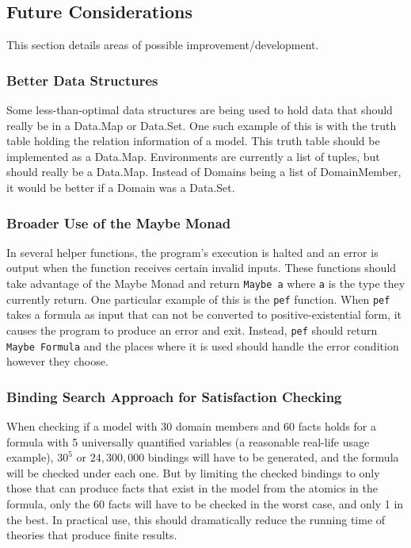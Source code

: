 	\subsection{Future Considerations}

		This section details areas of possible improvement/development.

		\subsubsection{Better Data Structures}

			Some less-than-optimal data structures are being used to hold data
			that should really be in a Data.Map or Data.Set. One such example
			of this is with the truth table holding the relation information of
			a model. This truth table should be implemented as a Data.Map.
			Environments are currently a list of tuples, but should really be a
			Data.Map. Instead of Domains being a list of DomainMember, it
			would be better if a Domain was a Data.Set.

		\subsubsection{Broader Use of the Maybe Monad}

			In several helper functions, the program's execution is halted and
			an error is output when the function receives certain invalid
			inputs. These functions should take advantage of the Maybe Monad
			and return {\tt Maybe a} where {\tt a} is the type they currently
			return. One particular example of this is the {\tt pef} function.
			When {\tt pef} takes a formula as input that can not be converted
			to positive-existential form, it causes the program to produce an
			error and exit. Instead, {\tt pef} should return {\tt Maybe
			Formula} and the places where it is used should handle the error
			condition however they choose.

		\subsubsection{Binding Search Approach for Satisfaction Checking}

			When checking if a model with 30 domain members and 60 facts holds
			for a formula with 5 universally quantified variables (a reasonable
			real-life usage example), $30^5$ or $24,300,000$ bindings will have
			to be generated, and the formula will be checked under each one.
			But by limiting the checked bindings to only those that can produce
			facts that exist in the model from the atomics in the formula, only
			the 60 facts will have to be checked in the worst case, and only 1
			in the best. In practical use, this should dramatically reduce the
			running time of theories that produce finite results.

